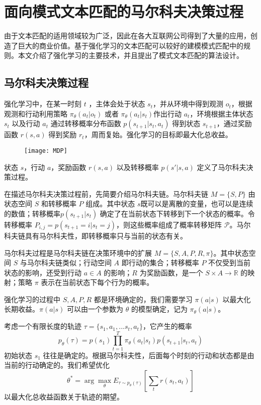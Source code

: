 \chapter{面向模式文本匹配的马尔科夫决策过程}

由于文本匹配的适用领域较为广泛，因此在各大互联网公司得到了大量的应用，创造了巨大的商业价值。基于强化学习的文本匹配可以较好的建模模式匹配中的规则。本文介绍了强化学习的主要技术，并且提出了模式文本匹配的算法设计。

\section{马尔科夫决策过程}
强化学习中，在某一时刻 $t$ ，主体会处于状态 $s_t$，并从环境中得到观测 $o_t$，根据观测和行动利用策略 $\pi_\theta(a_t|o_t)$ 或者 $\pi_\theta(a_t|s_t)$作出行动 $a_t$，环境根据主体状态 $s_t$ 以及行动 $a_t$ 通过转移概率分布函数 $p(s_{t+1}| s_t, a_t)$ 得到状态 $s_{t+1}$，通过奖励函数 $r(s, a)$ 得到奖励 $r_t$，周而复始。强化学习的目标即最大化总收益。

\begin{figure}[!htbp]
    \centering
    \texttt{[image: MDP]}
    \label{fig:MDP}
\end{figure}

状态 $s$，行动 $a$，奖励函数 $r(s,a)$ 以及转移概率 $p(s'|s,a)$ 定义了马尔科夫决策过程。

在描述马尔科夫决策过程前，先简要介绍马尔科夫链。马尔科夫链 $M=\{S, P\}$ 由状态空间 $S$ 和转移概率 $P$ 组成。其中状态 $s$既可以是离散的变量，也可以是连续的数值；转移概率$p(s_{t+1}|s_t)$ 确定了在当前状态下转移到下一个状态的概率。令转移概率 $P_{i, j}=p(s_{t+1}=i|s_t=j)$，则这些概率组成了概率转移矩阵 $\mathcal{P}$。马尔科夫链具有马尔科夫性，即转移概率只与当前的状态有关。

马尔科夫过程是马尔科夫链在决策环境中的扩展 $M=\{S, A, P, R, \pi\}$。其中状态空间 $S$ 与马尔科夫链类似；行动空间 $A$ 即行动的集合；转移概率 $P$ 不仅受到当前状态的影响，还受到行动 $a\in A$ 的影响；$R$ 为奖励函数，是一个 $S\times A\to \mathbb{R}$ 的映射；策略 $\pi$ 表示在当前状态下每个行为的概率。

强化学习的过程中 $S, A, P, R$ 都是环境确定的，我们需要学习 $\pi(a|s)$ 以最大化长期收益。$\pi(a|s)$  可以由一个参数为 $\theta$ 的模型确定，记为 $\pi_\theta(a|s)$。

考虑一个有限长度的轨迹 $\tau=\{s_1,a_1,...s_t,a_t\}$，它产生的概率
$$
p_\theta(\tau) = p(s_1)\prod_{t=1}^T \pi_\theta(a_t|s_t)p(s_{t+1}|s_t,a_t)
$$
初始状态 $s_1$ 往往是确定的。根据马尔科夫性，后面每个时刻的行动和状态都是由当前的行动确定的。我们希望优化
$$\theta^* = \arg\max_\theta E_{\tau\sim p_\theta(\tau)}[\sum_t r(s_t, a_t)]$$以最大化总收益函数关于轨迹的期望。


